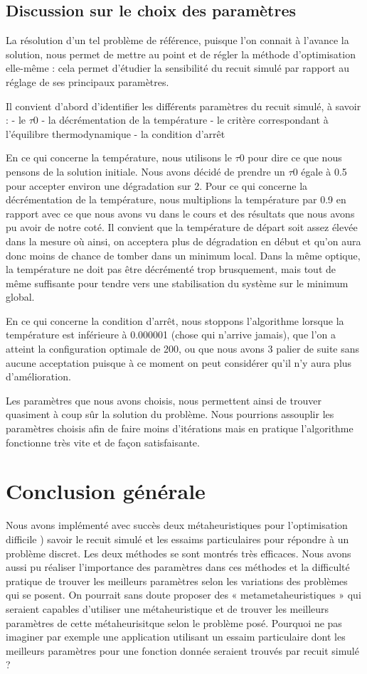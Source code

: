 \documentclass{report}
\begin{document}
\section{Discussion sur le choix des paramètres}
La résolution d'un tel problème de référence, puisque l'on connait à l'avance la solution, nous permet de mettre au point et de régler la méthode d'optimisation elle-même : cela permet d'étudier la sensibilité du recuit simulé par rapport au réglage de ses principaux paramètres.

Il convient d'abord d'identifier les différents paramètres du recuit simulé, à savoir :
- le $\tau 0$
- la décrémentation de la température
- le critère correspondant à l'équilibre thermodynamique
- la condition d'arrêt

En ce qui concerne la température, nous utilisons le $\tau 0$ pour dire ce que nous pensons de la solution initiale. Nous avons décidé de prendre un $\tau 0$ égale à 0.5 pour accepter environ une dégradation sur 2. Pour ce qui concerne la décrémentation de la température, nous multiplions la température par 0.9 en rapport avec ce que nous avons vu dans le cours et des résultats que nous avons pu avoir de notre coté. Il convient que la température de départ soit assez élevée dans la mesure où ainsi, on acceptera plus de dégradation en début et qu'on aura donc moins de chance de tomber dans un minimum local. Dans la même optique, la température ne doit pas être décrémenté trop brusquement, mais tout de même suffisante pour tendre vers une stabilisation du système sur le minimum global.

En ce qui concerne la condition d'arrêt, nous stoppons l'algorithme lorsque la température est inférieure à 0.000001 (chose qui n'arrive jamais), que l'on a atteint la configuration optimale de 200, ou que nous avons 3 palier de suite sans aucune acceptation puisque à ce moment on peut considérer qu'il n'y aura plus d'amélioration.

Les paramètres que nous avons choisis, nous permettent ainsi de trouver quasiment à coup sûr la solution du problème. Nous pourrions assouplir les paramètres choisis afin de faire moins d'itérations mais en pratique l'algorithme fonctionne très vite et de façon satisfaisante.

\chapter{Conclusion générale}
Nous avons implémenté avec succès deux métaheuristiques pour l'optimisation difficile ) savoir le recuit simulé et les essaims particulaires pour répondre à un problème discret. Les deux méthodes se sont montrés très efficaces. Nous avons aussi pu réaliser l'importance des paramètres dans ces méthodes et la difficulté pratique de trouver les meilleurs paramètres selon les variations des problèmes qui se posent. On pourrait sans doute proposer des « metametaheuristiques » qui seraient capables d’utiliser une métaheuristique et de trouver
les meilleurs paramètres de cette métaheurisitque selon le problème posé. Pourquoi
ne pas imaginer par exemple une application utilisant un essaim particulaire dont les
meilleurs paramètres pour une fonction donnée seraient trouvés par recuit simulé ?
\end{document}
